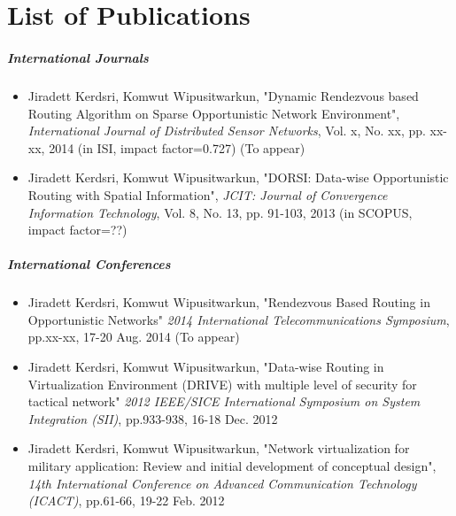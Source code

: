 \chapter{List of Publications}
\label{app1}


\paragraph{International Journals}

\begin{itemize}
\item Jiradett Kerdsri, Komwut Wipusitwarkun, "Dynamic Rendezvous based Routing Algorithm on Sparse Opportunistic Network Environment", \textit{International Journal of Distributed Sensor Networks}, Vol. x, No. xx, pp. xx-xx, 2014 (in ISI, impact factor=0.727)
(To appear)
  \item Jiradett Kerdsri, Komwut Wipusitwarkun, "DORSI: Data-wise Opportunistic Routing with Spatial Information", \textit{JCIT: Journal of Convergence Information Technology}, Vol. 8, No. 13, pp. 91-103, 2013 (in SCOPUS, impact factor=??)
\end{itemize}


\paragraph{International Conferences}

\begin{itemize}
\item Jiradett Kerdsri, Komwut Wipusitwarkun, "Rendezvous Based Routing in Opportunistic Networks" \textit{2014 International Telecommunications Symposium}, pp.xx-xx, 17-20 Aug. 2014
(To appear)
\item Jiradett Kerdsri, Komwut Wipusitwarkun, "Data-wise Routing in Virtualization Environment (DRIVE) with multiple level of security for tactical network" \textit{2012 IEEE/SICE International Symposium on System Integration (SII)}, pp.933-938, 16-18 Dec. 2012
\item Jiradett Kerdsri, Komwut Wipusitwarkun, "Network virtualization for military application: Review and initial development of conceptual design", \textit{14th International Conference on Advanced Communication Technology (ICACT)}, pp.61-66, 19-22 Feb. 2012  
\end{itemize}
